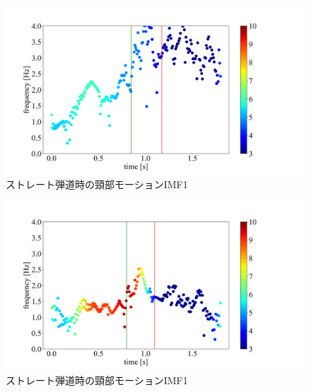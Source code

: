 
\begin{figure}
    \centering
    \includegraphics[width=1.0\linewidth]{./images/straight_data/neck/IMF4.png}
    \caption{ストレート弾道時の頸部モーションIMF1}
    \label{straight neck imf4}
\end{figure}

\begin{figure}
    \centering
    \includegraphics[width=1.0\linewidth]{./images/headup_data/neck/IMF4.png}
    \caption{ストレート弾道時の頸部モーションIMF1}
    \label{headup neck imf4}
\end{figure}

